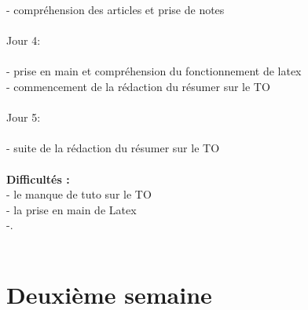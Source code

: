 \documentclass{article}
\begin{document}
        - compréhension des articles et prise de notes\\\\
    Jour 4: \\\\
        - prise en main et compréhension du fonctionnement de latex\\
        - commencement de la rédaction du résumer sur le TO\\\\
    Jour 5: \\\\
        - suite de la rédaction du résumer sur le TO\\\\
    \textbf{Difficultés : }\newline\\
    - le manque de tuto sur le TO\\
    - la prise en main de Latex\\
    -.\\\\
    
\section{Deuxième semaine}
\end{document}
